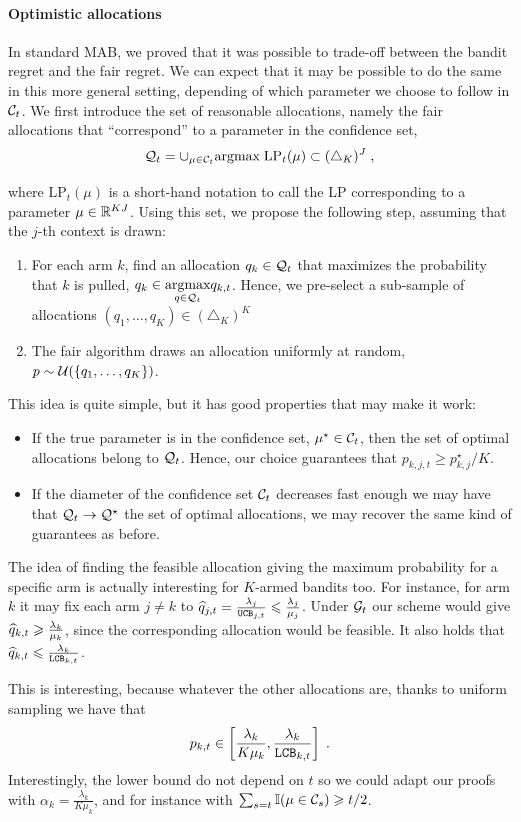 \paragraph{Optimistic allocations} In standard MAB, we proved that it was possible to trade-off between the bandit regret and the fair regret. We can expect that it may be possible to do the same in this more general setting, depending of which parameter we choose to follow in $\mathcal{C}_t$. We first introduce the set of reasonable allocations, namely the fair allocations that ``correspond'' to a parameter in the confidence set,
\[\mathcal{Q}_t = \cup_{\mu \in \mathcal{C}_t} \underset{}{\text{argmax}} \; \text{LP}_t(\mu) \subset (\triangle_{K})^J \;, \]
where $\text{LP}_t(\mu)$ is a short-hand notation to call the LP corresponding to a parameter $\mu \in \mathbb{R}^{KJ}$. Using this set, we propose the following step, assuming that the $j$-th context is drawn:
\begin{enumerate}
	\item For each arm $k$, find an allocation $q_k \in \mathcal{Q}_t$ that maximizes the probability that $k$ is pulled, $q_k\in \underset{q \in \mathcal{Q}_t}{\text{argmax}} q_{k,t}$. Hence, we pre-select a sub-sample of allocations $(q_1, \dots, q_K)\in (\triangle_K)^K$ 
	\item The fair algorithm draws an allocation uniformly at random, $p\sim \mathcal{U}(\{q_1,\dots, q_K \})$.
\end{enumerate}

This idea is quite simple, but it has good properties that may make it work: 
\begin{itemize}
	\item If the true parameter is in the confidence set, $\mu^\star \in \mathcal{C}_t$, then the set of optimal allocations belong to $\mathcal{Q}_t$. Hence, our choice guarantees that $p_{k,j,t}\geq p_{k,j}^\star/K$.
	\item If the diameter of the confidence set $\mathcal{C}_t$ decreases fast enough we may have that $\mathcal{Q}_t \to \mathcal{Q}^\star$ the set of optimal allocations, we may recover the same kind of guarantees as before.
\end{itemize}

\begin{remark}
	The idea of finding the feasible allocation giving the maximum probability for a specific arm is actually interesting for $K$-armed bandits too. For instance, for arm $k$ it may fix each arm $j\neq k$ to $\widehat{q}_{j,t} = \frac{\lambda_j}{\texttt{UCB}_{j,t}}\leqslant \frac{\lambda_j}{\mu_j}$. Under $\mathcal{G}_t$ our scheme would give $\widehat{q}_{k,t}\geqslant \frac{\lambda_k}{\mu_k}$, since the corresponding allocation would be feasible. It also holds that $\widehat{q}_{k,t}\leqslant \frac{\lambda_k}{\texttt{LCB}_{k,t}}$.
	
	This is interesting, because whatever the other allocations are, thanks to uniform sampling  we have that 
	\[p_{k,t} \in \left[\frac{\lambda_k}{K\mu_k}, \frac{\lambda_k}{\texttt{LCB}_{k,t}} \right]\;. \]
	Interestingly, the lower bound do not depend on $t$ so we could adapt our proofs with $\alpha_k=\frac{\lambda_k}{K\mu_k}$, and for instance with $\sum_{s=t}\mathbb{I}(\mu \in \mathcal{C}_s)\geqslant t/2$.
\end{remark}

